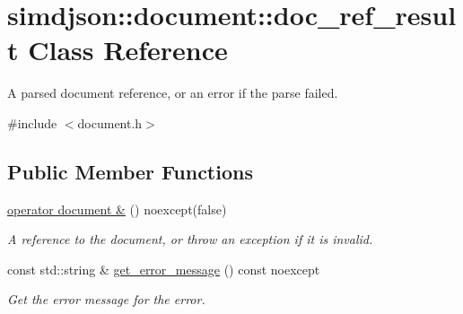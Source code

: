 \hypertarget{classsimdjson_1_1document_1_1doc__ref__result}{}\section{simdjson\+:\+:document\+:\+:doc\+\_\+ref\+\_\+result Class Reference}
\label{classsimdjson_1_1document_1_1doc__ref__result}


A parsed document reference, or an error if the parse failed.  




{\ttfamily \#include $<$document.\+h$>$}

\subsection*{Public Member Functions}
\begin{DoxyCompactItemize}
\item 
\hyperlink{classsimdjson_1_1document_1_1doc__ref__result_a6b32b150a42315944f4c73097f0eb700}{operator document \&} () noexcept(false)
\begin{DoxyCompactList}\small\item\em A reference to the document, or throw an exception if it is invalid. \end{DoxyCompactList}\item 
\mbox{\label{classsimdjson_1_1document_1_1doc__ref__result_ab1cab84bc5a466ac81475d8908f531a6}} 
const std\+::string \& \hyperlink{classsimdjson_1_1document_1_1doc__ref__result_ab1cab84bc5a466ac81475d8908f531a6}{get\+\_\+error\+\_\+message} () const noexcept
\begin{DoxyCompactList}\small\item\em Get the error message for the error. \end{DoxyCompactList}\end{DoxyCompactItemize}
